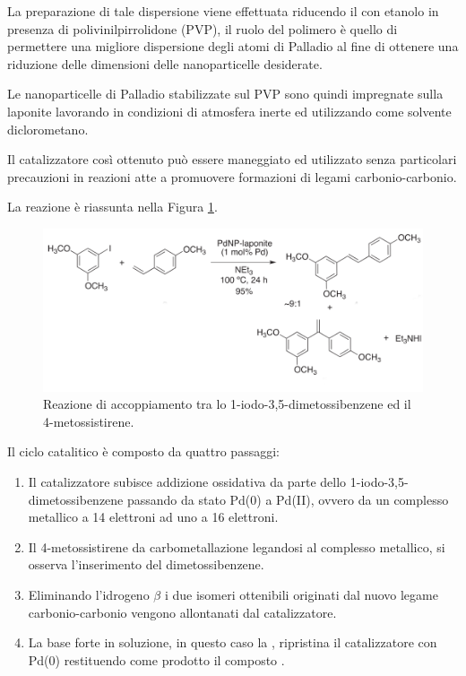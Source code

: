 \documentclass[a4paper, 12pt]{article}
\begin{document}
La preparazione di tale dispersione viene effettuata riducendo il  con etanolo in presenza di polivinilpirrolidone (PVP), il ruolo del polimero è quello di permettere una migliore dispersione degli atomi di Palladio al fine di ottenere una riduzione delle dimensioni delle nanoparticelle desiderate.

Le nanoparticelle di Palladio stabilizzate sul PVP sono quindi impregnate sulla laponite lavorando in condizioni di atmosfera inerte ed utilizzando come solvente diclorometano. \autocite{martinez_extremely_2015}

Il catalizzatore così ottenuto può essere maneggiato ed utilizzato senza particolari precauzioni in reazioni atte a promuovere formazioni di legami carbonio-carbonio.

La reazione è riassunta nella Figura \ref{fig:h-m_resveratrolo}.

\begin{figure}[H]
	\centering
	\includegraphics[width=\linewidth]{immagini/h-m_resveratrolo.png}
	\caption{Reazione di accoppiamento tra lo 1-iodo-3,5-dimetossibenzene ed il 4-metossistirene.}
	\label{fig:h-m_resveratrolo}
\end{figure}

Il ciclo catalitico è composto da quattro passaggi:
\begin{enumerate}
	\item Il catalizzatore  subisce addizione ossidativa da parte dello 1-iodo-3,5-dimetossibenzene passando da stato Pd(0) a Pd(II), ovvero da un complesso metallico a 14 elettroni ad uno a 16 elettroni.
	\item Il 4-metossistirene da carbometallazione legandosi al complesso metallico, si osserva l'inserimento del dimetossibenzene.
	\item Eliminando l'idrogeno \(\beta\) i due isomeri ottenibili originati dal nuovo legame carbonio-carbonio vengono allontanati dal catalizzatore.
	\item La base forte in soluzione, in questo caso la , ripristina il catalizzatore con Pd(0) restituendo come prodotto il composto .
\end{enumerate}
\end{document}
